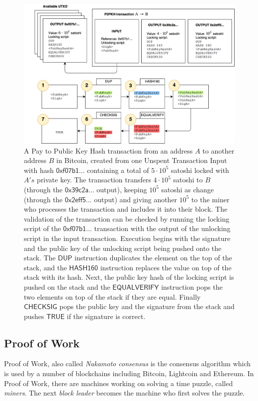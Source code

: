 \documentclass{style/kththesis}
\begin{document}
\begin{figure}
    \centering
    \includegraphics[width=\textwidth]{figures/bitcoin-payment}
    \caption[skip=50pt]{A Pay to Public Key Hash transaction from an address $A$ to another address $B$ in Bitcoin, created from one Unspent Transaction Input with hash $\mathsf{0xf07b1}\ldots$ containing a total of $5 \cdot 10^5$ satoshi locked with $A's$ private key. The transaction transfers $4 \cdot 10^5$ satoshi to $B$ (through the $\mathsf{0x39c2a}\ldots$ output), keeping $10^5$ satoshi as change (through the $\mathsf{0x2eff5}\ldots$ output) and giving another $10^5$ to the miner who processes the transaction and includes it into their block. The validation of the transaction can be checked by running the locking script of the $\mathsf{0xf07b1}\ldots$ transaction with the output of the unlocking script in the input transaction. Execution begins with the signature and the public key of the unlocking script being pushed onto the stack. The $\mathsf{DUP}$ instruction duplicates the element on the top of the stack, and the $\mathsf{HASH160}$ instruction replaces the value on top of the stack with its hash. Next, the public key hash of the locking script is pushed on the stack and the $\mathsf{EQUALVERIFY}$ instruction pops the two elements on top of the stack if they are equal. Finally $\mathsf{CHECKSIG}$ pops the public key and the signature from the stack and pushes $\mathsf{TRUE}$ if the signature is correct.}
    \label{fig:bitcoin-payment}
\end{figure}

\subsection{Proof of Work}
\label{pow}
Proof of Work, also called \textit{Nakamoto consensus} is the consensus algorithm which is used by a number of blockchains including Bitcoin, Lightcoin and Ethereum. In Proof of Work, there are machines working on solving a time puzzle, called \emph{miners}. The next \emph{block leader} becomes the machine who first solves the puzzle.
\end{document}
